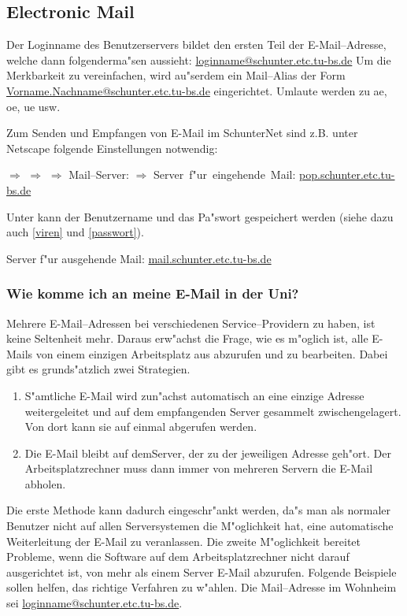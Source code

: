 
\subsection{Electronic Mail}

Der Loginname des Benutzerservers bildet den ersten Teil der \glossar
E-Mail--Adresse, welche dann folgenderma"sen aussieht:
\url{loginname@schunter.etc.tu-bs.de}
Um die Merkbarkeit zu vereinfachen, wird au"serdem ein Mail--Alias der Form
\url{Vorname.Nachname@schunter.etc.tu-bs.de} eingerichtet. Umlaute werden zu
ae, oe, ue usw. 

Zum Senden und Empfangen von E-Mail im SchunterNet sind z.B. unter Netscape
folgende Einstellungen notwendig:

 $\Rightarrow$  $\Rightarrow$  $\Rightarrow$ \mbox{Mail--Server:} $\Rightarrow$
  \mbox{Server f"ur eingehende Mail:} \url{pop.schunter.etc.tu-bs.de}

Unter  kann der Benutzername und das Pa"swort
gespeichert werden (siehe dazu auch \ref{viren} und \ref{passwort}).

Server f"ur ausgehende Mail: \url{mail.schunter.etc.tu-bs.de}

\subsubsection*{Wie komme ich an meine E-Mail in der Uni?}

Mehrere E-Mail--Adressen bei verschiedenen Service--Providern zu haben, ist
keine Seltenheit mehr. Daraus erw"achst die Frage, wie es m"oglich ist, alle
\glossar E-Mails von einem einzigen Arbeitsplatz aus abzurufen und zu
bearbeiten. Dabei gibt es grunds"atzlich zwei Strategien. 

\begin{enumerate}
  \item S"amtliche \glossar E-Mail wird zun"achst automatisch an eine einzige
    Adresse weitergeleitet und auf dem empfangenden \glossar Server gesammelt
    zwischengelagert. Von dort kann sie auf einmal abgerufen werden. 
  \item Die \glossar E-Mail bleibt auf dem\glossar  Server, der zu der
    jeweiligen Adresse geh"ort. Der Arbeitsplatzrechner muss dann immer von
    mehreren \glossar Servern die \glossar E-Mail abholen.
\end{enumerate} 

Die erste Methode kann dadurch eingeschr"ankt werden, da"s man als normaler
Benutzer nicht auf allen \glossar Serversystemen die M"oglichkeit hat, eine
automatische Weiterleitung der \glossar E-Mail zu veranlassen. Die zweite
M"oglichkeit bereitet Probleme, wenn die Software auf dem Arbeitsplatzrechner
nicht darauf ausgerichtet ist, von mehr als einem \glossar Server \glossar
E-Mail abzurufen. Folgende Beispiele sollen helfen, das richtige Verfahren zu
w"ahlen. Die Mail--Adresse im Wohnheim sei \url{loginname@schunter.etc.tu-bs.de}.

